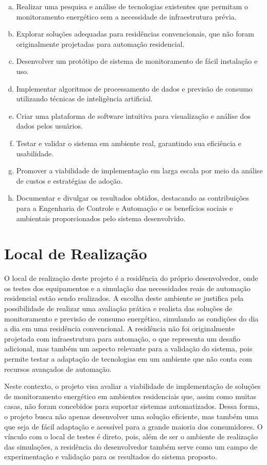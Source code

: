 \begin{enumerate}[a)]
\item Realizar uma pesquisa e análise de tecnologias existentes que permitam o monitoramento energético sem a necessidade de infraestrutura prévia.
\item Explorar soluções adequadas para residências convencionais, que não foram originalmente projetadas para automação residencial.
\item Desenvolver um protótipo de sistema de monitoramento de fácil instalação e uso.
\item Implementar algoritmos de processamento de dados e previsão de consumo utilizando técnicas de inteligência artificial.
\item Criar uma plataforma de software intuitiva para visualização e análise dos dados pelos usuários.
\item Testar e validar o sistema em ambiente real, garantindo sua eficiência e usabilidade.
\item Promover a viabilidade de implementação em larga escala por meio da análise de custos e estratégias de adoção.
\item Documentar e divulgar os resultados obtidos, destacando as contribuições para a Engenharia de Controle e Automação e os benefícios sociais e ambientais proporcionados pelo sistema desenvolvido.
\end{enumerate}

\section{Local de Realização}
\label{sec:empresa}

O local de realização deste projeto é a residência do próprio desenvolvedor, onde os testes dos equipamentos e a simulação das necessidades reais de automação residencial estão sendo realizados. A escolha deste ambiente se justifica pela possibilidade de realizar uma avaliação prática e realista das soluções de monitoramento e previsão de consumo energético, simulando as condições do dia a dia em uma residência convencional. A residência não foi originalmente projetada com infraestrutura para automação, o que representa um desafio adicional, mas também um aspecto relevante para a validação do sistema, pois permite testar a adaptação de tecnologias em um ambiente que não conta com recursos avançados de automação.

Neste contexto, o projeto visa avaliar a viabilidade de implementação de soluções de monitoramento energético em ambientes residenciais que, assim como muitas casas, não foram concebidos para suportar sistemas automatizados. Dessa forma, o projeto busca não apenas desenvolver uma solução eficiente, mas também uma que seja de fácil adaptação e acessível para a grande maioria dos consumidores. O vínculo com o local de testes é direto, pois, além de ser o ambiente de realização das simulações, a residência do desenvolvedor também serve como um campo de experimentação e validação para os resultados do sistema proposto.

